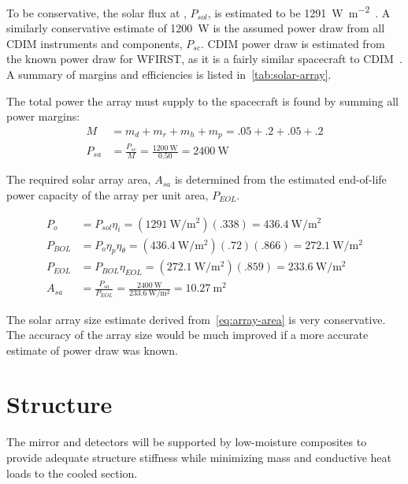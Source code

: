 \documentclass{ws-jai}
\begin{document}
To be conservative, the solar flux at \Ltwo, $P_{sol}$, is estimated to be \SI{1291}{\watt\per\meter\squared}~\cite{evans2002natural}.
A similarly conservative estimate of \SI{1200}{\watt} is the assumed power draw from all CDIM instruments and components, $P_{sc}$.
CDIM power draw is estimated from the known power draw for WFIRST, as it is a fairly similar spacecraft to CDIM~\cite{wfirstFinal2012}.
A summary of margins and efficiencies is listed in~\autoref{tab:solar-array}.

The total power the array must supply to the spacecraft is found by summing all power margins:
\begin{equation}
  \begin{align}
    M &= m_d + m_r + m_h + m_p = .05 +.2 + .05 + .2 \\
    P_{sa} &= \frac{P_{sc}}{M} = \frac{\SI{1200}{\watt}}{0.50} = \SI{2400}{\watt}
  \end{align}
\end{equation}

The required solar array area, $A_{sa}$ is determined from the estimated end-of-life power capacity of the array per unit area, $P_{EOL}$.

\begin{equation} \label{eq:array-area}
  \begin{align}
    P_{o} &= P_{sol}\eta_i = (\SI{1291}{\watt\per\meter\squared})(.338) = \SI{436.4}{\watt\per\meter\squared} \\
    P_{BOL} &= P_o\eta_p\eta_{\theta} = (\SI{436.4}{\watt\per\meter\squared})(.72)(.866) = \SI{272.1}{\watt\per\meter\squared} \\
    P_{EOL} &= P_{BOL}\eta_{EOL} = (\SI{272.1}{\watt\per\meter\squared})(.859) = \SI{233.6}{\watt\per\meter\squared} \\
    A_{sa} &= \frac{P_{sa}}{P_{EOL}} = \frac{\SI{2400}{\watt}}{\SI{233.6}{\watt\per\meter\squared}} = \SI{10.27}{\meter\squared}
  \end{align}
\end{equation}

The solar array size estimate derived from~\ref{eq:array-area} is very conservative.
The accuracy of the array size would be much improved if a more accurate estimate of power draw was known.

\section{Structure}
\label{sec:structure}
The mirror and detectors will be supported by low-moisture composites to provide adequate structure stiffness while minimizing mass and conductive heat loads to the cooled section.
\end{document}
